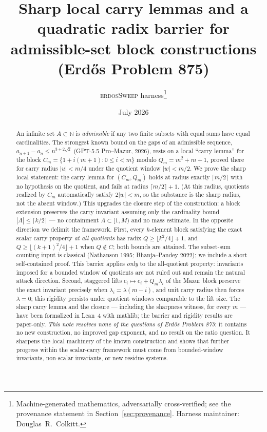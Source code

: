 \documentclass[11pt]{article}
\title{Sharp local carry lemmas and a quadratic radix barrier for
admissible-set block constructions\\[2pt]
{\large (Erd\H{o}s Problem 875)}}
\author{\textsc{erdosSweep} harness\thanks{Machine-generated mathematics,
adversarially cross-verified; see the provenance statement in
Section~\ref{sec:provenance}. Harness maintainer: Douglas~R.~Colkitt.}}
\date{July 2026}
\theoremstyle{definition}
\theoremstyle{remark}
\newcommand{\N}{\mathbb{N}}
\begin{document}
\maketitle

\begin{abstract}
An infinite set $A\subset\N$ is \emph{admissible} if any two finite subsets
with equal sums have equal cardinalities. The strongest known bound on the
gaps of an admissible sequence, $a_{n+1}-a_n\le n^{3+2\sqrt2}$ (GPT-5.5
Pro--Mazur, 2026), rests on a local ``carry lemma'' for the block
$C_m=\{1+i(m+1):0\le i<m\}$ modulo $Q_m=m^2+m+1$, proved there for carry
radius $|u|<m/4$ under the quotient window $|w|<m/2$. We prove the sharp
local statement: the carry lemma for $(C_m,Q_m)$ holds at radius exactly
$\lceil m/2\rceil$ with no hypothesis on the quotient, and fails at radius
$\lceil m/2\rceil+1$. (At this radius, quotients realized by $C_m$
automatically satisfy $2|w|<m$, so the substance is the sharp radius,
not the absent window.) This upgrades the closure step of the construction: a block
extension preserves the carry invariant assuming only the cardinality bound
$|A|\le\lceil k/2\rceil$ --- no containment $A\subset[1,M)$ and no mass
estimate. In the opposite direction we delimit the framework. First, every
$k$-element block satisfying the exact scalar carry property \emph{at all
quotients} has radix $Q\ge\lfloor k^2/4\rfloor+1$, and
$Q\ge\lfloor(k+1)^2/4\rfloor+1$ when $Q\notin C$; both bounds are attained.
The subset-sum counting input is classical (Nathanson 1995; Bhanja--Pandey
2022); we include a short self-contained proof. This barrier applies
\emph{only} to the all-quotient property: invariants imposed for a bounded
window of quotients are not ruled out and remain the natural attack
direction. Second, staggered lifts $c_i\mapsto c_i+Q_m\lambda_i$ of the
Mazur block preserve the exact invariant precisely when
$\lambda_i=\lambda(m-i)$, and unit carry radius then forces $\lambda=0$;
this rigidity persists under quotient windows comparable to the lift size.
The sharp carry lemma and the closure --- including the sharpness witness,
for every $m$ --- have been formalized in Lean~4 with mathlib; the barrier
and rigidity results are paper-only.
\emph{This note resolves none of the questions of Erd\H{o}s Problem 875}:
it contains no new construction, no improved gap exponent, and no result on
the ratio question. It sharpens the local machinery of the known
construction and shows that further progress within the scalar-carry
framework must come from bounded-window invariants, non-scalar invariants,
or new residue systems.
\end{abstract}
\end{document}
